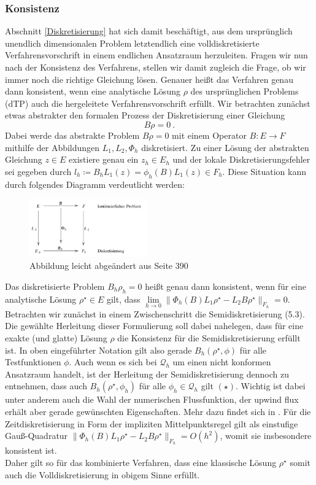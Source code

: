 \subsubsection{Konsistenz}
	 Abschnitt \ref{Diskretisierung} hat sich damit beschäftigt, aus dem ursprünglich unendlich dimensionalen Problem letztendlich eine volldiskretisierte Verfahrensvorschrift in einem endlichen Ansatzraum herzuleiten. Fragen wir nun nach der Konsistenz des Verfahrens, stellen wir damit zugleich die Frage, ob wir immer noch die richtige Gleichung lösen. Genauer heißt das Verfahren genau dann konsistent, wenn eine analytische Lösung $ \rho $ des ursprünglichen Problems (dTP) auch die hergeleitete Verfahrensvorschrift erfüllt. 
	 Wir betrachten zunächst etwas abstrakter den formalen Prozess der Diskretisierung einer Gleichung \[ B \rho=0 \ .  \]
	 Dabei werde das abstrakte Problem $ B \rho=0 $ mit einem Operator $ B: E \to F $ mithilfe der Abbildungen $ L_1,L_2,\Phi_h $ diskretisiert.
	 Zu einer Lösung der abstrakten Gleichung $ z \in E $ existiere genau ein $ z_h \in E_h$ und der lokale Diskretisierungsfehler sei gegeben durch $
	 l_h \coloneqq B_h L_1(z) = \phi_h(B) L_1(z) \in F_h 
	 $. Diese Situation kann durch folgendes Diagramm verdeutlicht werden:
	 \begin{figure}[H]
	 	\centering
	 	\includegraphics[width=0.45\textwidth]{abstraktkonsistenz2.png} \\
	 	Abbildung leicht abgeändert aus \cite{brokate2016grundwissen} Seite 390
	 \end{figure}
	 Das diskretisierte Problem $ B_h \rho_h = 0  $ heißt genau dann konsistent, wenn für eine analytische Lösung $ \rho^{\star} \in E $ gilt, dass $ \lim\limits_{h \to 0}\lVert \Phi_h(B)L_1\rho^{\star} - L_2B\rho^{\star} \rVert_{F_h} = 0 $.
	 Betrachten wir zunächst in einem Zwischenschritt die Semidiskretisierung (5.3).
	 Die gewählte Herleitung dieser Formulierung soll dabei nahelegen, dass für eine exakte (und glatte) Lösung $ \rho $ die Konsistenz für die Semidiskretisierung erfüllt ist. In oben eingeführter Notation gilt also gerade $ B_h(\rho^{\star},\phi) $ für alle Testfunktionen $ \phi $. Auch wenn es sich bei $ \mathcal{Q}_h $ um einen nicht konformen Ansatzraum handelt, ist der Herleitung der Semidiskretisierung dennoch zu entnehmen, dass auch $ B_h(\rho^{\star},\phi_h) $ für alle $ \phi_h \in \mathcal{Q}_h $ gilt $(\star)$.  Wichtig ist dabei unter anderem auch die Wahl der numerischen Flussfunktion, der upwind flux erhält aber gerade gewünschten Eigenschaften. 
	 Mehr dazu findet sich in \cite{Har08b}.
	 Für die Zeitdiskretisierung in Form der impliziten Mittelpunktsregel gilt als einstufige Gauß-Quadratur $ \lVert \Phi_h(B)L_1\rho^{\star} - L_2B\rho^{\star} \rVert_{F_h} = O(h^2)$, womit sie insbesondere konsistent ist. \\
	 Daher gilt so für das kombinierte Verfahren, dass eine klassische Lösung $ \rho^{\star} $ somit auch die Volldiskretisierung in obigem Sinne erfüllt. 
